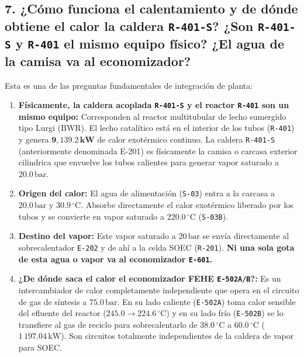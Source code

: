 \documentclass[11pt,a4paper]{article}
\begin{document}
\subsection{7. ¿Cómo funciona el calentamiento y de dónde obtiene el calor la caldera \texttt{R-401-S}? ¿Son \texttt{R-401-S} y \texttt{R-401} el mismo equipo físico? ¿El agua de la camisa va al economizador?}
Esta es una de las preguntas fundamentales de integración de planta:
\begin{enumerate}
    \item \textbf{Físicamente, la caldera acoplada \texttt{R-401-S} y el reactor \texttt{R-401} son un mismo equipo:} Corresponden al reactor multitubular de lecho sumergido tipo Lurgi (BWR). El lecho catalítico está en el interior de los tubos (\texttt{R-401}) y genera $\mathbf{9{,}139.2\,\text{kW}}$ de calor exotérmico continuo. La caldera \texttt{R-401-S} (anteriormente denominada E-201) es físicamente la camisa o carcasa exterior cilíndrica que envuelve los tubos calientes para generar vapor saturado a $20.0\,\text{bar}$.
    \item \textbf{Origen del calor:} El agua de alimentación (\texttt{S-03}) entra a la carcasa a $20.0\,\text{bar}$ y $30.9\,^\circ\text{C}$. Absorbe directamente el calor exotérmico liberado por los tubos y se convierte en vapor saturado a $220.0\,^\circ\text{C}$ (\texttt{S-03B}).
    \item \textbf{Destino del vapor:} Este vapor saturado a $20\,\text{bar}$ se envía directamente al sobrecalentador \texttt{E-202} y de ahí a la celda SOEC (\texttt{R-201}). \textbf{Ni una sola gota de esta agua o vapor va al economizador \texttt{E-601}.}
    \item \textbf{¿De dónde saca el calor el economizador FEHE \texttt{E-502A/B}?:} Es un intercambiador de calor completamente independiente que opera en el circuito de gas de síntesis a $75.0\,\text{bar}$. En su lado caliente (\texttt{E-502A}) toma calor sensible del efluente del reactor ($245.0 \to 224.6\,^\circ\text{C}$) y en su lado frío (\texttt{E-502B}) se lo transfiere al gas de reciclo para sobrecalentarlo de $38.0\,^\circ\text{C}$ a $60.0\,^\circ\text{C}$ ($1\,197.04\,\text{kW}$). Son circuitos totalmente independientes de la caldera de vapor para SOEC.
\end{enumerate}
\end{document}
